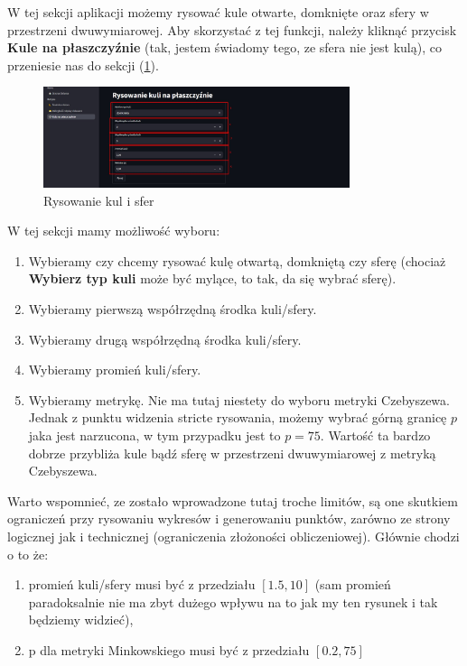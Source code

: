 \documentclass[article,11pt]{mwrep}
\begin{document}
W tej sekcji aplikacji możemy rysować kule otwarte, domknięte oraz sfery w przestrzeni dwuwymiarowej. Aby skorzystać z tej funkcji, należy kliknąć przycisk \textbf{Kule na płaszczyźnie} (tak, jestem świadomy tego, ze sfera nie jest kulą), co przeniesie nas do sekcji (\ref{rys:rk}). 

\begin{figure}[H] 
    \centering
    \includegraphics[width=0.8\textwidth]{figure/Screenshot_8.jpg}
    \caption{Rysowanie kul i sfer}\label{rys:rk}
\end{figure}

W tej sekcji mamy możliwość wyboru:
\begin{enumerate}
    \item Wybieramy czy chcemy rysować kulę otwartą, domkniętą czy sferę (chociaż \textbf{Wybierz typ kuli} może być mylące, to tak, da się wybrać sferę).
    \item Wybieramy pierwszą współrzędną środka kuli/sfery.
    \item Wybieramy drugą współrzędną środka kuli/sfery.
    \item Wybieramy promień kuli/sfery. 
    \item Wybieramy metrykę. Nie ma tutaj niestety do wyboru metryki Czebyszewa. Jednak z punktu widzenia stricte rysowania, możemy wybrać górną granicę $p$ jaka jest narzucona, w tym przypadku jest to $p=75$. Wartość ta bardzo dobrze przybliża kule bądź sferę w przestrzeni dwuwymiarowej z metryką Czebyszewa. 
\end{enumerate}

Warto wspomnieć, ze zostało wprowadzone tutaj troche limitów, są one skutkiem ograniczeń przy rysowaniu wykresów i generowaniu punktów, zarówno ze strony logicznej jak i technicznej (ograniczenia złożoności obliczeniowej). Głównie chodzi o to że:
\begin{enumerate}
    \item promień kuli/sfery musi być z przedziału $[1.5, 10]$ (sam promień paradoksalnie nie ma zbyt dużego wpływu na to jak my ten rysunek i tak będziemy widzieć),
    \item p dla metryki Minkowskiego musi być z przedziału $[0.2, 75]$ 
\end{enumerate}
\end{document}
